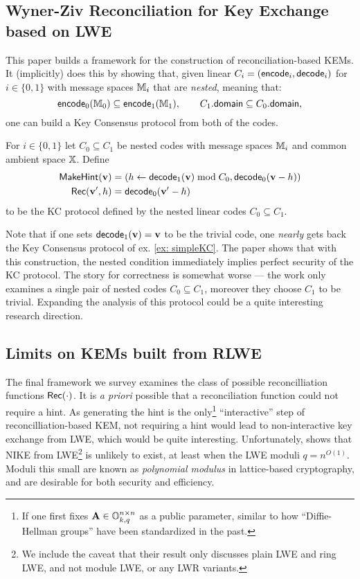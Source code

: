 \subsection{Wyner-Ziv Reconciliation for Key Exchange based on LWE}\label{ssec: wyner-ziv}
This paper \cite{EPRINT:SalLuzLin20} builds a framework for the construction of reconciliation-based KEMs.
It (implicitly) does this by showing that, given linear $C_i = (\mathsf{encode}_i, \mathsf{decode}_i)$ for $i\in\{0,1\}$ with message spaces $\mathbb{M}_i$ that are \emph{nested}, meaning that:
\begin{equation*}
\mathsf{encode}_0(\mathbb{M}_0)\subseteq \mathsf{encode}_1(\mathbb{M}_1),\qquad C_1.\mathsf{domain}\subseteq C_0.\mathsf{domain},
\end{equation*}
one can build a Key Consensus protocol from both of the codes.
\begin{definition}
	For $i\in\{0,1\}$ let $C_0\subseteq C_1$ be nested codes with message spaces $\mathbb{M}_i$ and common ambient space $\mathbb{X}$.
	Define
	\begin{align*}
	\mathsf{MakeHint}(\mathbf{v}) &= (h\gets \mathsf{decode}_1(\mathbf{v})\bmod C_0, \mathsf{decode}_0(\mathbf{v} - h))\\
	\mathsf{Rec}(\mathbf{v}', h) &= \mathsf{decode}_0(\mathbf{v}' - h)
	\end{align*}
	to be the KC protocol defined by the nested linear codes $C_0\subseteq C_1$.
\end{definition} 
Note that if one sets $\mathsf{decode}_1(\mathbf{v}) = \mathbf{v}$ to be the trivial code, one \emph{nearly} gets back the Key Consensus protocol of ex. \ref{ex: simpleKC}.
The paper shows that with this construction, the nested condition immediately implies perfect security of the KC protocol.
The story for correctness is somewhat worse --- the work only examines a single pair of nested codes $C_0\subseteq C_1$, moreover they choose $C_1$ to be trivial.
Expanding the analysis of this protocol could be a quite interesting research direction.
\subsection{Limits on KEMs built from RLWE}
The final framework we survey \cite{EPRINT:GKRS20} examines the class of possible reconcilliation functions $\mathsf{Rec}(\cdot)$.
It is \emph{a priori} possible that a reconciliation function could not require a hint.
As generating the hint is the only\footnote{If one first fixes  $\mathbf{A}\in\mathbb{O}_{k, q}^{n\times n}$ as a public parameter, similar to how ``Diffie-Hellman groups'' have been standardized in the past.} ``interactive'' step of reconcilliation-based KEM, not requiring a hint would lead to non-interactive key exchange from LWE, which would be quite interesting.
Unfortunately, \cite{EPRINT:GKRS20} shows that NIKE from LWE\footnote{We include the caveat that their result only discusses plain LWE and ring LWE, and not module LWE, or any LWR variants.} is unlikely to exist, at least when the LWE moduli $q = n^{O(1)}$.
Moduli this small are known as \emph{polynomial modulus} in lattice-based cryptography, and are desirable for both security and efficiency.

